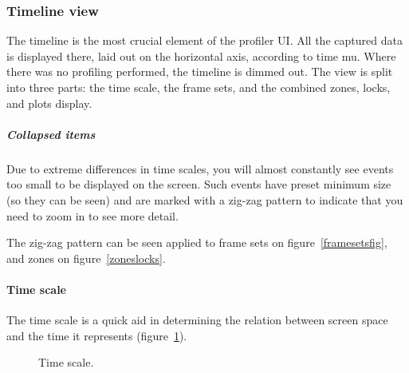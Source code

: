 \documentclass[hidelinks,titlepage,a4paper,twoside]{article}
\begin{document}
\subsubsection{Timeline view}

The timeline is the most crucial element of the profiler UI. All the captured data is displayed there, laid out on the horizontal axis, according to time mu. Where there was no profiling performed, the timeline is dimmed out. The view is split into three parts: the time scale, the frame sets, and the combined zones, locks, and plots display.

\subparagraph{Collapsed items}
\label{collapseditems}

Due to extreme differences in time scales, you will almost constantly see events too small to be displayed on the screen. Such events have preset minimum size (so they can be seen) and are marked with a zig-zag pattern to indicate that you need to zoom in to see more detail.

The zig-zag pattern can be seen applied to frame sets on figure~\ref{framesetsfig}, and zones on figure~\ref{zoneslocks}.

\paragraph{Time scale}

The time scale is a quick aid in determining the relation between screen space and the time it represents (figure~\ref{timescale}).

\begin{figure}[h]
\centering{}
\caption{Time scale.}
\label{timescale}
\end{figure}
\end{document}

